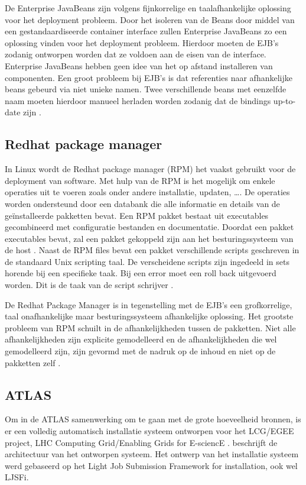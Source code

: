 De Enterprise JavaBeans zijn volgens \citet{softwareDeployment} fijnkorrelige en taalafhankelijke oplossing voor het deployment probleem.
Door het isoleren van de Beans door middel van een gestandaardiseerde container interface zullen Enterprise JavaBeans zo een oplossing vinden voor het deployment probleem.
Hierdoor moeten de EJB's zodanig ontworpen worden dat ze voldoen aan de eisen van de interface.
Enterprise JavaBeans hebben geen idee van het op afstand installeren van componenten.
Een groot probleem bij EJB's is dat referenties naar afhankelijke beans gebeurd via niet unieke namen.
Twee verschillende beans met eenzelfde naam moeten hierdoor manueel herladen worden zodanig dat de bindings up-to-date zijn \citep{rutherford2002reconfiguration}.

\subsection{Redhat package manager}
In Linux wordt de Redhat package manager (RPM) het vaakst gebruikt voor de deployment van software.
Met hulp van de RPM is het mogelijk om enkele operaties uit te voeren zoals onder andere installatie, updaten, \ldots .
De operaties worden ondersteund door een databank die alle informatie en details van de geïnstalleerde pakketten bevat.
Een RPM pakket bestaat uit executables gecombineerd met configuratie bestanden en documentatie.
Doordat een pakket executables bevat, zal een pakket gekoppeld zijn aan het besturingssysteem van de host \citep{bailey1997maximum}.
Naast de RPM files bevat een pakket verschillende scripts geschreven in de standaard Unix scripting taal.
De verscheidene scripts zijn ingedeeld in sets horende bij een specifieke taak.
Bij een error moet een roll back uitgevoerd worden.
Dit is de taak van de script schrijver \citep{softwareDeployment}.

De Redhat Package Manager is in tegenstelling met de EJB's een grofkorrelige, taal onafhankelijke maar besturingssysteem afhankelijke oplossing.
Het grootste probleem van RPM schuilt in de afhankelijkheden tussen de pakketten.
Niet alle afhankelijkheden zijn explicite gemodelleerd en de afhankelijkheden die wel gemodelleerd zijn, zijn gevormd met de nadruk op de inhoud en niet op de pakketten zelf \citep{softwareDeployment}.  

\subsection{ATLAS}\label{sec:ATLAS}
Om in de ATLAS samenwerking om te gaan met de grote hoeveelheid bronnen, is er een volledig automatisch installatie systeem ontworpen voor het LCG/EGEE project, LHC Computing Grid/Enabling Grids for E-sciencE \citep{bird2005lhc}. 
\citet{salvo2008atlas} beschrijft de architectuur van het ontworpen systeem.
Het ontwerp van het installatie systeem werd gebaseerd op het Light Job Submission Framework for installation, ook wel LJSFi.

